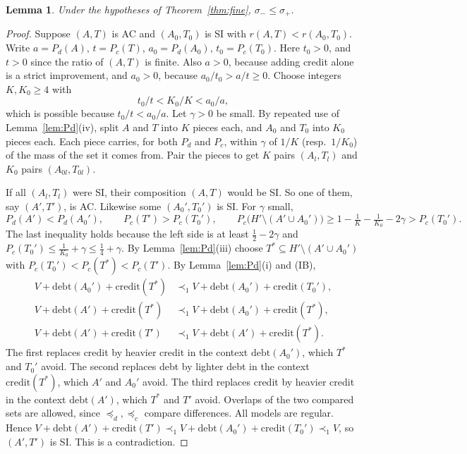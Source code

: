 \documentclass[11pt]{article}
\newtheorem{lemma}[theorem]{Lemma}
\theoremstyle{definition}\newtheorem{definition}[theorem]{Definition}
\theoremstyle{remark}\newtheorem{remark}[theorem]{Remark}
\newcommand{\debt}{\mathrm{debt}}
\newcommand{\cred}{\mathrm{credit}}
\begin{document}
\begin{lemma}\label{lem:rates}
Under the hypotheses of Theorem~\ref{thm:fine}, $\sigma_-\le\sigma_+$.
\end{lemma}
\begin{proof}
Suppose $(A,T)$ is AC and $(A_0,T_0)$ is SI with $r(A,T)<r(A_0,T_0)$. Write
$a=P_d(A)$, $t=P_c(T)$, $a_0=P_d(A_0)$, $t_0=P_c(T_0)$. Here $t_0>0$, and
$t>0$ since the ratio of $(A,T)$ is finite. Also $a>0$, because adding credit
alone is a strict improvement, and $a_0>0$, because $a_0/t_0>a/t\ge0$.
Choose integers $K,K_0\ge4$ with
\[
 t_0/t<K_0/K<a_0/a,
\]
which is possible because $t_0/t<a_0/a$. Let $\gamma>0$ be small. By repeated
use of Lemma~\ref{lem:Pd}(iv), split $A$ and $T$ into $K$ pieces each, and
$A_0$ and $T_0$ into $K_0$ pieces each. Each piece carries, for both $P_d$
and $P_c$, within $\gamma$ of $1/K$ (resp.\ $1/K_0$) of the mass of the set
it comes from. Pair the pieces to get $K$ pairs $(A_l,T_l)$ and $K_0$ pairs
$(A_{0l},T_{0l})$.

If all $(A_l,T_l)$ were SI, their composition $(A,T)$ would be SI. So one of
them, say $(A',T')$, is AC. Likewise some $(A_0',T_0')$ is SI. For $\gamma$
small,
\[
 P_d(A')<P_d(A_0'),\qquad P_c(T')>P_c(T_0'),\qquad
 P_c\bigl(H'\setminus(A'\cup A_0')\bigr)\ge1-\tfrac1K-\tfrac1{K_0}-2\gamma
 >P_c(T_0').
\]
The last inequality holds because the left side is at least $\tfrac12-2\gamma$
and $P_c(T_0')\le\tfrac1{K_0}+\gamma\le\tfrac14+\gamma$.
By Lemma~\ref{lem:Pd}(iii) choose $T^*\subseteq H'\setminus(A'\cup A_0')$
with $P_c(T_0')<P_c(T^*)<P_c(T')$. By Lemma~\ref{lem:Pd}(i) and (IB),
\begin{align*}
 V+\debt(A_0')+\cred(T^*)&\prec_1V+\debt(A_0')+\cred(T_0'),\\
 V+\debt(A')+\cred(T^*)&\prec_1V+\debt(A_0')+\cred(T^*),\\
 V+\debt(A')+\cred(T')&\prec_1V+\debt(A')+\cred(T^*).
\end{align*}
The first replaces credit by heavier credit in the context $\debt(A_0')$,
which $T^*$ and $T_0'$ avoid. The second replaces debt by lighter debt in the
context $\cred(T^*)$, which $A'$ and $A_0'$ avoid. The third replaces credit
by heavier credit in the context $\debt(A')$, which $T^*$ and $T'$ avoid.
Overlaps of the two compared sets are allowed, since $\preceq_d,\preceq_c$
compare differences. All models are regular. Hence
$V+\debt(A')+\cred(T')\prec_1V+\debt(A_0')+\cred(T_0')\prec_1V$, so
$(A',T')$ is SI. This is a contradiction.
\end{proof}
\end{document}
